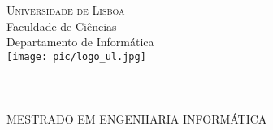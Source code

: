
\pagestyle{empty}

\begin{center}
\vspace{3cm}\normalfont\normalfont
\textsc{\huge{Universidade de Lisboa}}\\
\LARGE{Faculdade de Ci\^{e}ncias}\\
\Large{Departamento de Inform\'{a}tica}\\
\vspace{1cm}
\texttt{[image: pic/logo\_ul.jpg]}\\

\vspace{2cm}
\PEIIdiomaTese
\Large{\bf \PEITITULO}\\
\vspace{1cm}
\vspace{0.7cm}
\vspace{0.7cm}
\Large{\bf \PEIAutor}\\
\vspace{2.4cm}
\Large{\bf \PEITIPO}\\
\vfill
\Large{MESTRADO EM ENGENHARIA INFORM\'{A}TICA}\\

\vfill
\PEIAno

\end{center}
\newpage
\mbox{}
\newpage

\setcounter{page}{1}


